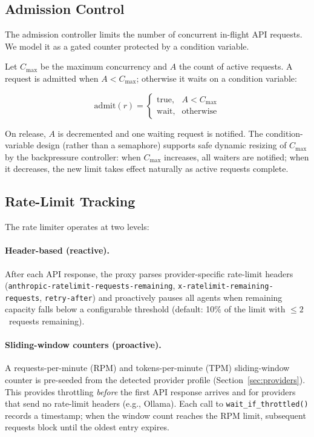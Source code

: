 \documentclass[11pt,twocolumn]{article}
\begin{document}
\subsection{Admission Control}
\label{sec:admission}

The admission controller limits the number of concurrent
in-flight API requests.  We model it as a gated counter
protected by a condition variable.

Let $C_{\max}$ be the maximum concurrency and $A$ the count
of active requests.  A request is admitted when
$A < C_{\max}$; otherwise it waits on a condition variable:

\begin{equation}
\label{eq:admission}
\text{admit}(r) =
\begin{cases}
  \text{true},  & A < C_{\max} \\
  \text{wait},  & \text{otherwise}
\end{cases}
\end{equation}

On release, $A$ is decremented and one waiting request is
notified.  The condition-variable design (rather than a
semaphore) supports safe dynamic resizing of $C_{\max}$ by the
backpressure controller: when $C_{\max}$ increases, all waiters
are notified; when it decreases, the new limit takes effect
naturally as active requests complete.

\subsection{Rate-Limit Tracking}
\label{sec:ratelimit}

The rate limiter operates at two levels:

\paragraph{Header-based (reactive).}
After each API response, the proxy parses provider-specific
rate-limit headers
(\texttt{anthropic-ratelimit-requests-remaining},
\texttt{x-ratelimit-remaining-requests},
\texttt{retry-after}) and proactively pauses all agents when
remaining capacity falls below a configurable threshold
(default: 10\% of the limit with $\leq 2$~requests remaining).

\paragraph{Sliding-window counters (proactive).}
A requests-per-minute (RPM) and tokens-per-minute (TPM)
sliding-window counter is pre-seeded from the detected provider
profile (Section~\ref{sec:providers}).  This provides throttling
\emph{before} the first API response arrives and for providers
that send no rate-limit headers (e.g., Ollama).  Each call to
\texttt{wait\_if\_throttled()} records a timestamp; when the
window count reaches the RPM limit, subsequent requests block
until the oldest entry expires.
\end{document}
